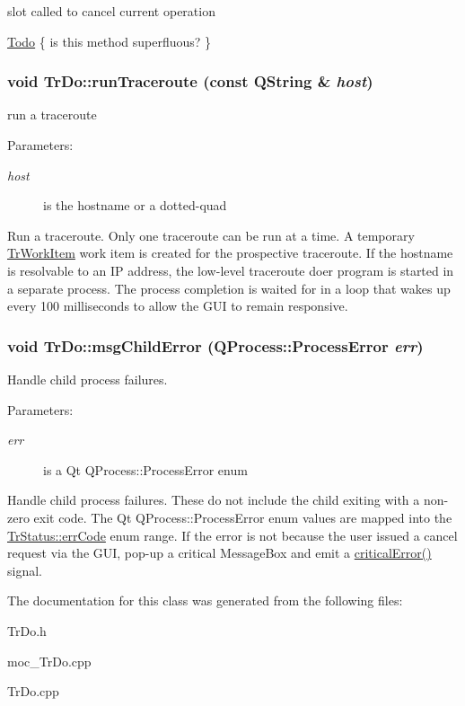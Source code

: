 slot called to cancel current operation \begin{Desc}
\item[\hyperlink{todo__todo000004}{Todo}]\{ is this method superfluous? \} \end{Desc}
\hypertarget{classTrDo_04829a8efd9827ec069150bb3a9880ff}{
\subsubsection[runTraceroute]{\setlength{\rightskip}{0pt plus 5cm}void TrDo::runTraceroute (const QString \& {\em host})}}
\label{classTrDo_04829a8efd9827ec069150bb3a9880ff}


run a traceroute \begin{Desc}
\item[Parameters:]
\begin{description}
\item[{\em host}]is the hostname or a dotted-quad\end{description}
\end{Desc}
Run a traceroute. Only one traceroute can be run at a time. A temporary \hyperlink{classTrWorkItem}{TrWorkItem} work item is created for the prospective traceroute. If the hostname is resolvable to an IP address, the low-level traceroute doer program is started in a separate process. The process completion is waited for in a loop that wakes up every 100 milliseconds to allow the GUI to remain responsive. \hypertarget{classTrDo_2725ad3cfadba888fb540ea9189f07b3}{
\subsubsection[msgChildError]{\setlength{\rightskip}{0pt plus 5cm}void TrDo::msgChildError (QProcess::ProcessError {\em err})}}
\label{classTrDo_2725ad3cfadba888fb540ea9189f07b3}


Handle child process failures. \begin{Desc}
\item[Parameters:]
\begin{description}
\item[{\em err}]is a Qt QProcess::ProcessError enum\end{description}
\end{Desc}
Handle child process failures. These do not include the child exiting with a non-zero exit code. The Qt QProcess::ProcessError enum values are mapped into the \hyperlink{classTrStatus_366057e7e0cc467a592518e5f0da5302}{TrStatus::errCode} enum range. If the error is not because the user issued a cancel request via the GUI, pop-up a critical MessageBox and emit a \hyperlink{classTrDo_71b0a7cd37eae74dcc72a844e3d26485}{criticalError()} signal. 

The documentation for this class was generated from the following files:\begin{CompactItemize}
\item 
TrDo.h\item 
moc\_\-TrDo.cpp\item 
TrDo.cpp\end{CompactItemize}
